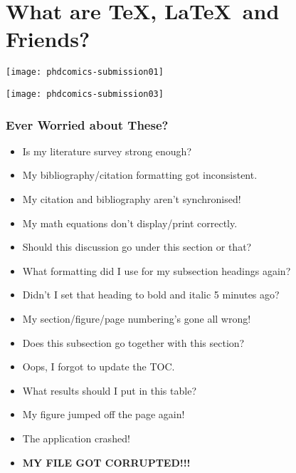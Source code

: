 \section[Introduction]{What are \TeX, \LaTeX\ and Friends?}

\begin{frame}

\texttt{[image: phdcomics-submission01]}\par
{}
\hfill\texttt{[image: phdcomics-submission03]}

\end{frame}


\begin{frame}
\frametitle{Ever Worried about These?}
\begin{itemize}
\item<2-16> Is my literature survey strong enough?
\item<3-15,17|alert@17|trans:alert@1|handout:alert@1> My bibliography/citation formatting got inconsistent.
\item<4-15,17|alert@17|trans:alert@1|handout:alert@1> My citation and bibliography aren't synchronised!
\item<5-15,17|alert@17|trans:alert@1|handout:alert@1> My math equations don't display/print correctly.
\item<6-16> Should this discussion go under this section or that?
\item<7-15,17|alert@17|trans:alert@1|handout:alert@1> What formatting did I use for my subsection headings again?
\item<8-15,17|alert@17|trans:alert@1|handout:alert@1> Didn't I set that heading to bold and italic 5 minutes ago?
\item<9-15,17|alert@17|trans:alert@1|handout:alert@1> My section/figure/page numbering's gone all wrong!
\item<10-16> Does this subsection go together with this section?
\item<11-15,17|alert@17|trans:alert@1|handout:alert@1> Oops, I forgot to update the TOC.
\item<12-16> What results should I put in this table?
\item<13-15,17|alert@17|trans:alert@1|handout:alert@1> My figure jumped off the page again!
\item<14-15,17|alert@17|trans:alert@1|handout:alert@1> The application crashed!
\item<15-15,17|alert@17|trans:alert@1|handout:alert@1> \textbf{MY FILE GOT CORRUPTED!!!}
\end{itemize}
\end{frame}

